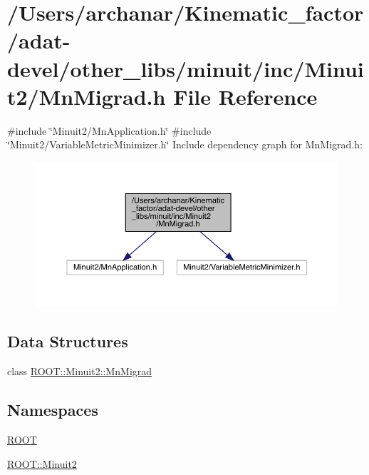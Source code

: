 \hypertarget{adat-devel_2other__libs_2minuit_2inc_2Minuit2_2MnMigrad_8h}{}\section{/\+Users/archanar/\+Kinematic\+\_\+factor/adat-\/devel/other\+\_\+libs/minuit/inc/\+Minuit2/\+Mn\+Migrad.h File Reference}
\label{adat-devel_2other__libs_2minuit_2inc_2Minuit2_2MnMigrad_8h}
{\ttfamily \#include \char`\"{}Minuit2/\+Mn\+Application.\+h\char`\"{}}\newline
{\ttfamily \#include \char`\"{}Minuit2/\+Variable\+Metric\+Minimizer.\+h\char`\"{}}\newline
Include dependency graph for Mn\+Migrad.\+h\+:
\nopagebreak
\begin{figure}[H]
\begin{center}
\leavevmode
\includegraphics[width=350pt]{df/d55/adat-devel_2other__libs_2minuit_2inc_2Minuit2_2MnMigrad_8h__incl}
\end{center}
\end{figure}
\subsection*{Data Structures}
\begin{DoxyCompactItemize}
\item 
class \mbox{\hyperlink{classROOT_1_1Minuit2_1_1MnMigrad}{R\+O\+O\+T\+::\+Minuit2\+::\+Mn\+Migrad}}
\end{DoxyCompactItemize}
\subsection*{Namespaces}
\begin{DoxyCompactItemize}
\item 
 \mbox{\hyperlink{namespaceROOT}{R\+O\+OT}}
\item 
 \mbox{\hyperlink{namespaceROOT_1_1Minuit2}{R\+O\+O\+T\+::\+Minuit2}}
\end{DoxyCompactItemize}
